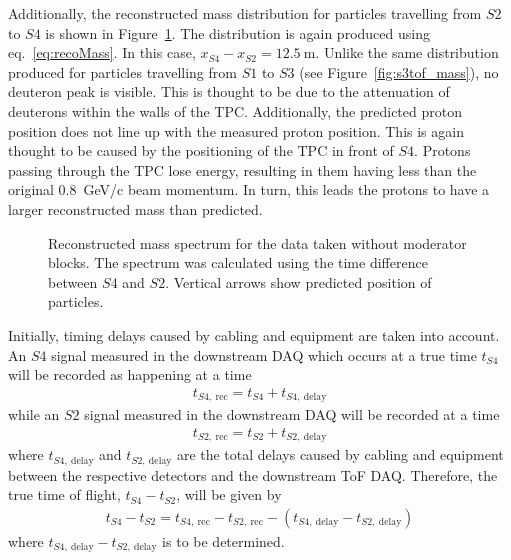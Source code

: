 Additionally, the reconstructed mass distribution for particles travelling from $\mathit{S2}$ to $\mathit{S4}$ is shown in Figure~\ref{fig:s4tof_mass}. 
The distribution is again produced using eq.~\ref{eq:recoMass}.
In this case, $x_{\mathit{S4}}-x_{\mathit{S2}} = 12.5~\text{m}$.
Unlike the same distribution produced for particles travelling from $\mathit{S1}$ to $\mathit{S3}$ (see Figure~\ref{fig:s3tof_mass}), no deuteron peak is visible.
This is thought to be due to the attenuation of deuterons within the walls of the TPC.
Additionally, the predicted proton position does not line up with the measured proton position. 
This is again thought to be caused by the positioning of the TPC in front of $\mathit{S4}$.
Protons passing through the TPC lose energy, resulting in them having less than the original 0.8~GeV/c beam momentum.
In turn, this leads the protons to have a larger reconstructed mass than predicted.

\begin{figure}[h]
  \centering
  \begin{adjustbox}{max totalsize={.8\textwidth}{.5\textheight},center}
    
  \end{adjustbox}
  \caption{Reconstructed mass spectrum for the data taken without moderator blocks. The spectrum was calculated using the time difference between $\mathit{S4}$ and $\mathit{S2}$. Vertical arrows show predicted position of particles.}
  \label{fig:s4tof_mass}
\end{figure}

Initially, timing delays caused by cabling and equipment are taken into account.
An $\mathit{S4}$ signal measured in the downstream DAQ which occurs at a true time $t_{\mathit{S4}}$ will be recorded as happening at a time
\begin{align}
  t_{\mathit{S4},~\text{rec}} = t_{\mathit{S4}} + t_{\mathit{S4},~\text{delay}}
  \label{eq:delayS4}
\end{align}
while an $\mathit{S2}$ signal measured in the downstream DAQ will be recorded at a time
\begin{align}
  t_{\mathit{S2},~\text{rec}} = t_{\mathit{S2}} + t_{\mathit{S2},~\text{delay}}
  \label{eq:delayS2}
\end{align}
where $t_{\mathit{S4},~\text{delay}}$ and $t_{\mathit{S2},~\text{delay}}$ are the total delays caused by cabling and equipment between the respective detectors and the downstream ToF DAQ.
Therefore, the true time of flight, $t_{\mathit{S4}} - t_{\mathit{S2}}$, will be given by
\begin{align}
  t_{\mathit{S4}} - t_{\mathit{S2}} = t_{\mathit{S4},~\text{rec}} - t_{\mathit{S2},~\text{rec}} - \left( t_{\mathit{S4},~\text{delay}} - t_{\mathit{S2},~\text{delay}} \right)
  \label{eq:delayTof}
\end{align}
where $t_{\mathit{S4},~\text{delay}} - t_{\mathit{S2},~\text{delay}}$ is to be determined.

